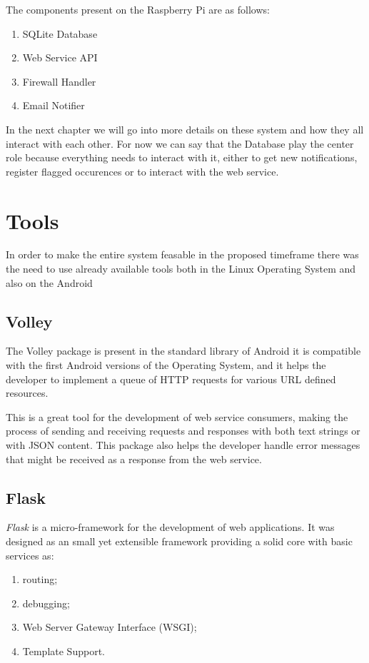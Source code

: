 The components present on the Raspberry Pi are as follows:
\begin{enumerate}
	\item SQLite Database
	\item Web Service API
	\item Firewall Handler
	\item Email Notifier
\end{enumerate}

In the next chapter we will go into more details on these system and how they
all interact with each other. For now we can say that the Database play the
center role because everything needs to interact with it, either to get new
notifications, register flagged occurences or to interact with the web service.

\section{Tools}
\label{chap3:sec:tools}
In order to make the entire system feasable in the proposed timeframe there was
the need to use already available tools both in the Linux Operating System and
also on the Android

\subsection{Volley}
\label{chap3:sec:tools:sub:volley}
The Volley package is present in the standard library of Android it is
compatible with the first Android versions of the Operating System, and it helps
the developer to implement a queue of HTTP requests for various URL defined
resources.

This is a great tool for the development of web service consumers, making the
process of sending and receiving requests and responses with both text strings
or with JSON content. This package also helps the developer handle error
messages that might be received as a response from the web service.

\subsection{Flask}
\label{chap3:sec:tools:sub:flask}
\emph{Flask} is a micro-framework for the development of web applications. It
was designed as an small yet extensible framework providing a solid core with
basic services as:
\begin{enumerate}
	\item routing;
	\item debugging;
	\item Web Server Gateway Interface (WSGI);
	\item Template Support.
\end{enumerate}

